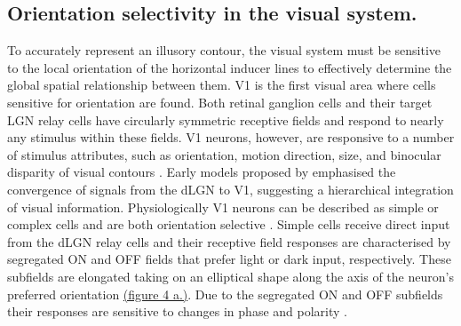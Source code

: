 \documentclass[12pt]{article}
\begin{document}

\subsection{Orientation selectivity in the visual system.}
To accurately represent an illusory contour, the visual system must be sensitive to the local orientation of the horizontal inducer lines to effectively determine the global spatial relationship between them. V1 is the first visual area where cells sensitive for orientation are found. Both retinal ganglion cells and their target LGN relay cells have circularly symmetric receptive fields and respond to nearly any stimulus within these fields. V1 neurons, however, are responsive to a number of stimulus attributes, such as orientation, motion direction, size, and binocular disparity of visual contours \autocite{hubelReceptiveFieldsBinocular1962}. 
Early models proposed by \textcite{hubelReceptiveFieldsBinocular1962} emphasised the convergence of signals from the dLGN to V1, suggesting a hierarchical integration of visual information. Physiologically V1 neurons can be described as simple or complex cells and are both orientation selective \autocite{skottunClassifyingSimpleComplex1991}. Simple cells receive direct input from the dLGN relay cells and their receptive field responses are characterised by segregated ON and OFF fields that prefer light or dark input, respectively. These subfields are elongated taking on an elliptical shape along the axis of the neuron's preferred orientation \hyperref[fig:LIF_Overview]{(figure 4 a.)}. Due to the segregated ON and OFF subfields their responses are sensitive to changes in phase and polarity \autocite{mechlerClassificationSimpleComplex2002}. 
\end{document}
